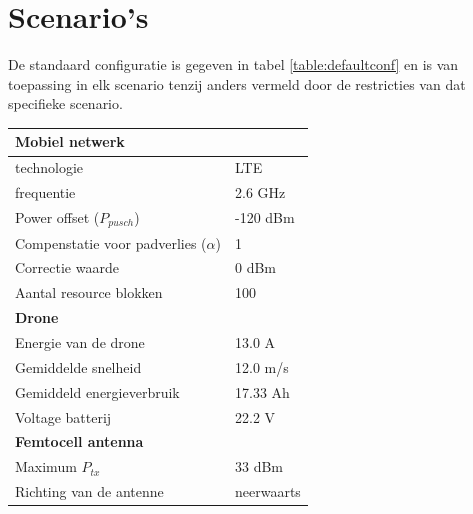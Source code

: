 \documentclass[twocolumn]{phdsymp_dutch}
\begin{document}
\section{Scenario's}

De standaard configuratie is gegeven in tabel \ref{table:defaultconf} en is van toepassing 
in elk scenario tenzij anders vermeld door de restricties van dat specifieke scenario.

\begin{table}[!htb]
\centering
\begin{tabular}[t]{ll}
        \toprule
        \multicolumn{2}{l}{\textbf{Mobiel netwerk}} \\
        \hline
        \hspace{3mm}  technologie        & LTE     \\
        \hspace{3mm}  frequentie         & 2.6 GHz \\
        \hspace{3mm}  Power offset ($P_{pusch}$)            & -120 dBm  \\
        \hspace{3mm}  Compenstatie voor padverlies ($\alpha$)   & 1  \\
        \hspace{3mm}  Correctie waarde                    & 0 dBm  \\
        \hspace{3mm}  Aantal resource blokken      & 100  \\
        \hline
        \multicolumn{2}{l}{\textbf{Drone}} \\
        \hline  
        \hspace{3mm}  Energie van de drone        & 13.0 A   \\
        \hspace{3mm}  Gemiddelde snelheid        & 12.0 m/s \\
        \hspace{3mm}  Gemiddeld energieverbruik      & 17.33 Ah    \\
        \hspace{3mm}  Voltage batterij       & 22.2 V \\
        \hline
        \multicolumn{2}{l}{\textbf{Femtocell antenna}} \\
        \hline  
        \hspace{3mm}  Maximum $P_{tx}$          & 33 dBm   \\
        \hspace{3mm}  Richting van de antenne   & neerwaarts   \\ 

\end{tabular}
\end{table}
\end{document}
